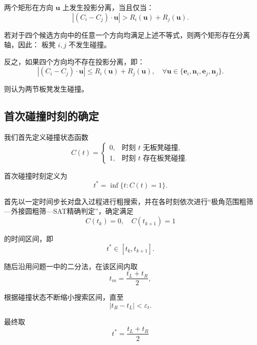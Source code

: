 两个矩形在方向 \(\mathbf{u}\) 上发生投影分离，当且仅当：
\begin{equation*}
|(C_i - C_j) \cdot \mathbf{u}| > R_i(\mathbf{u}) + R_j(\mathbf{u}).
\end{equation*}

若对于四个候选方向中的任意一个方向均满足上述不等式，则两个矩形存在分离轴，因此：
板凳 \(i,j\) 不发生碰撞。

反之，如果四个方向均不存在投影分离，即：
\begin{equation*}
|(C_i - C_j) \cdot \mathbf{u}| \leq R_i(\mathbf{u}) + R_j(\mathbf{u}), \quad \forall \mathbf{u} \in \{\mathbf{e}_i, \mathbf{n}_i, \mathbf{e}_j, \mathbf{n}_j\}.
\end{equation*}

则认为两节板凳发生碰撞。

\subsection{首次碰撞时刻的确定}
我们首先定义碰撞状态函数
\begin{equation*}
C(t) = \begin{cases} 0, & \text{时刻 } t \text{ 无板凳碰撞}, \\ 1, & \text{时刻 } t \text{ 存在板凳碰撞}. \end{cases}
\end{equation*}

首次碰撞时刻定义为
\begin{equation*}
t^* = \inf\{t : C(t) = 1\}.
\end{equation*}

首先以一定时间步长对盘入过程进行粗搜索，并在各时刻依次进行“极角范围粗筛—外接圆粗筛—SAT精确判定”，确定满足
\begin{equation*}
C(t_k) = 0, \quad C(t_{k+1}) = 1
\end{equation*}

的时间区间，即
\begin{equation*}
t^* \in [t_k, t_{k+1}].
\end{equation*}

随后沿用问题一中的二分法，在该区间内取
\begin{equation*}
t_m = \frac{t_L + t_R}{2},
\end{equation*}

根据碰撞状态不断缩小搜索区间，直至
\begin{equation*}
|t_R - t_L| < \varepsilon_t.
\end{equation*}

最终取
\begin{equation*}
t^* = \frac{t_L + t_R}{2}
\end{equation*}

